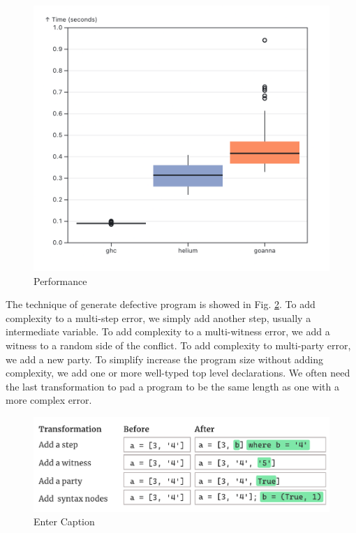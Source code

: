 \documentclass[pdflatex,sn-mathphys-num]{sn-jnl}%
\begin{document}
   \begin{figure}[ht!]
        \centering
        \includegraphics[width=0.7\linewidth]{images/performance-overall.png}
        \caption{Performance} 
        \label{fig:performance}
    \end{figure}
    
    The technique of generate defective program is showed in Fig. \ref{fig:error-generation}. To add complexity to a multi-step error, we simply add another step, usually a intermediate variable. To add complexity to a multi-witness error, we add a witness to a random side of the conflict. To add complexity to multi-party error, we add a new party. To simplify increase the program size without adding complexity, we add one or more well-typed top level declarations. We often need the last transformation to pad a program to be the same length as one with a more complex error.

    
    \begin{figure}
        \centering
        \includegraphics[width=0.5\linewidth]{images/evaluation-generating-errors.pdf}
        \caption{Enter Caption}
        \label{fig:error-generation}
    \end{figure}

    
\end{document}
